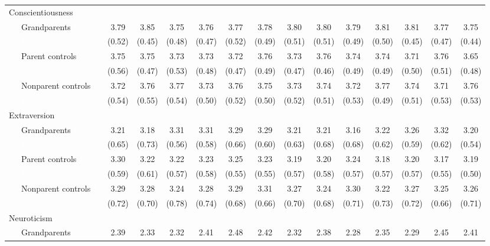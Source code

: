 \documentclass[
  english,
  man,floatsintext]{apa7}
\newenvironment{lltable}{\begin{landscape}\begin{center}\begin{ThreePartTable}}{\end{ThreePartTable}\end{center}\end{landscape}}
\begin{document}
\begin{lltable}
{\begin{longtable}{lccccccccccccc}
Conscientiousness &  &  &  &  &  &  &  &  &  &  &  &  & \\
\ \ \ Grandparents \textcolor{white}{C} & 3.79 & 3.85 & 3.75 & 3.76 & 3.77 & 3.78 & 3.80 & 3.80 & 3.79 & 3.81 & 3.81 & 3.77 & 3.75\\
\ \ \ \textcolor{white}{Cg} & (0.52) & (0.45) & (0.48) & (0.47) & (0.52) & (0.49) & (0.51) & (0.51) & (0.49) & (0.50) & (0.45) & (0.47) & (0.44)\\
\ \ \ Parent controls \textcolor{white}{C} & 3.75 & 3.75 & 3.73 & 3.73 & 3.72 & 3.76 & 3.73 & 3.76 & 3.74 & 3.74 & 3.71 & 3.76 & 3.65\\
\ \ \ \textcolor{white}{Cp} & (0.56) & (0.47) & (0.53) & (0.48) & (0.47) & (0.49) & (0.47) & (0.46) & (0.49) & (0.49) & (0.50) & (0.51) & (0.48)\\
\ \ \ Nonparent controls \textcolor{white}{C} & 3.72 & 3.76 & 3.77 & 3.73 & 3.76 & 3.75 & 3.73 & 3.74 & 3.72 & 3.77 & 3.74 & 3.71 & 3.76\\
\ \ \ \textcolor{white}{Cn} & (0.54) & (0.55) & (0.54) & (0.50) & (0.52) & (0.50) & (0.52) & (0.51) & (0.53) & (0.49) & (0.51) & (0.53) & (0.53)\\
Extraversion &  &  &  &  &  &  &  &  &  &  &  &  & \\
\ \ \ Grandparents \textcolor{white}{E} & 3.21 & 3.18 & 3.31 & 3.31 & 3.29 & 3.29 & 3.21 & 3.21 & 3.16 & 3.22 & 3.26 & 3.32 & 3.20\\
\ \ \ \textcolor{white}{Eg} & (0.65) & (0.73) & (0.56) & (0.58) & (0.66) & (0.60) & (0.63) & (0.68) & (0.68) & (0.62) & (0.59) & (0.62) & (0.54)\\
\ \ \ Parent controls \textcolor{white}{E} & 3.30 & 3.22 & 3.22 & 3.23 & 3.25 & 3.23 & 3.19 & 3.20 & 3.24 & 3.18 & 3.20 & 3.17 & 3.19\\
\ \ \ \textcolor{white}{Ep} & (0.59) & (0.61) & (0.57) & (0.58) & (0.55) & (0.55) & (0.57) & (0.58) & (0.57) & (0.57) & (0.57) & (0.55) & (0.50)\\
\ \ \ Nonparent controls \textcolor{white}{E} & 3.29 & 3.28 & 3.24 & 3.28 & 3.29 & 3.31 & 3.27 & 3.24 & 3.30 & 3.22 & 3.27 & 3.25 & 3.26\\
\ \ \ \textcolor{white}{En} & (0.72) & (0.70) & (0.78) & (0.74) & (0.68) & (0.66) & (0.70) & (0.68) & (0.71) & (0.73) & (0.72) & (0.66) & (0.71)\\
Neuroticism &  &  &  &  &  &  &  &  &  &  &  &  & \\
\ \ \ Grandparents \textcolor{white}{N} & 2.39 & 2.33 & 2.32 & 2.41 & 2.48 & 2.42 & 2.32 & 2.38 & 2.28 & 2.35 & 2.29 & 2.45 & 2.41\\

\end{longtable}}
\end{lltable}
\end{document}
